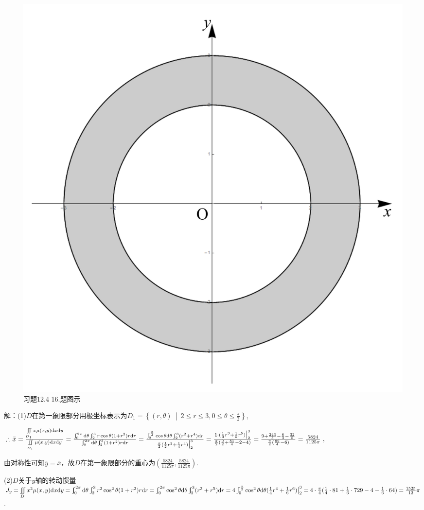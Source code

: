 \documentclass[12pt,UTF8]{ctexart}
\newcommand\Set[2]{\left\{#1\ \middle\vert\ #2 \right\}}
\newcommand{\Int}[4]{\varint\nolimits_{#1}^{#2}#3\mathrm d#4}
\newcommand{\varIInt}[4]{\iint\limits_{#1}#2\mathrm d#3\mathrm d#4}
\begin{document}
\begin{enumerate}
\begin{figure}[H]
\begin{center}
\includegraphics[height=0.4\textheight]{Figures19/Fig12-4-16.pdf}
\end{center}
\caption{习题12.4 16.题图示}
\label{12-4-16}
\end{figure}

解：(1)$D$在第一象限部分用极坐标表示为$D_1=\Set{(r,\theta)}{2\leqslant r\leqslant3,0\leqslant\theta\leqslant\frac\pi2}$,

$\therefore\bar{x}=\frac{\varIInt{D_1}{x\mu(x,y)}xy}{\varIInt{D_1}{\mu(x,y)}xy}=\frac{\Int0{2\pi}{}\theta\Int23{r\cos\theta(1+r^2)r}r}{\Int0{2\pi}{}\theta\Int23{(1+r^2)r}r}=\frac{\Int0{\frac\pi2}{\cos\theta}\theta\Int23{(r^2+r^4)}r}{\frac\pi2(\frac12r^2+\frac14r^4)\big|_2^3}=\frac{1\cdot(\frac13r^3+\frac15r^5)\big|_2^3}{\frac\pi2(\frac92+\frac{81}4-2-4)}=\frac{9+\frac{243}5-\frac83-\frac{32}5}{\frac\pi2(\frac{99}4-6)}\\
=\frac{5824}{1125\pi}$,

由对称性可知$\bar{y}=\bar{x}$，故$D$在第一象限部分的重心为$(\frac{5824}{1125\pi},\frac{5824}{1125\pi})$.

(2)$D$关于$y$轴的转动惯量\\
$J_y=\varIInt D{x^2\mu(x,y)}xy=\Int0{2\pi}{}\theta\Int23{r^2\cos^2\theta(1+r^2)r}r=\Int0{2\pi}{\cos^2\theta}\theta\Int23{(r^3+r^5)}r\\
=4\Int0{\frac\pi2}{\cos^2\theta}\theta(\frac14r^4+\frac16r^6)\big|_2^3=4\cdot\frac\pi4(\frac14\cdot81+\frac16\cdot729-4-\frac16\cdot64)=\frac{1525}{12}\pi$.


\end{enumerate}
\end{document}
